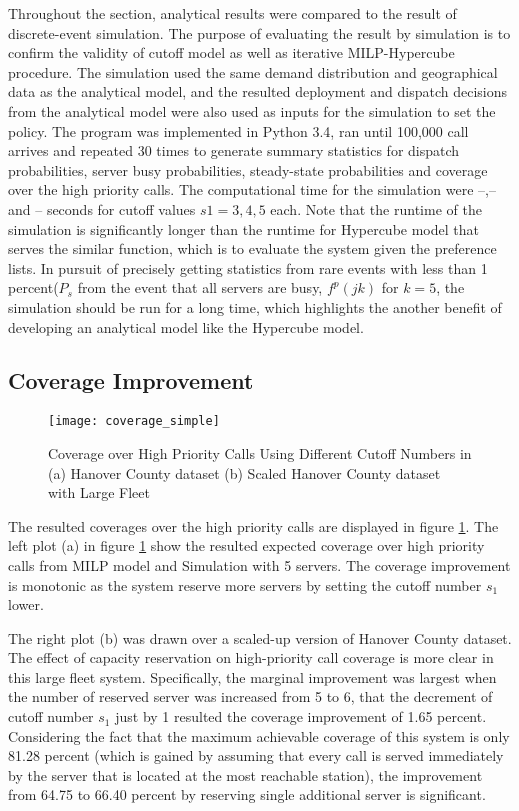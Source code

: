 \documentclass{article}
\begin{document}
Throughout the section, analytical results were compared to the result of discrete-event simulation. The purpose of evaluating the result by simulation is to confirm the validity of cutoff model as well as iterative MILP-Hypercube procedure. The simulation used the same demand distribution and geographical data as the analytical model, and the resulted deployment and dispatch decisions from the analytical model were also used as inputs for the simulation to set the policy. The program was implemented in Python 3.4, ran until 100,000 call arrives and repeated 30 times to generate summary statistics for dispatch probabilities, server busy probabilities, steady-state probabilities and coverage over the high priority calls. The computational time for the simulation were --,-- and -- seconds for cutoff values $s1=3,4,5$ each. Note that the runtime of the simulation is significantly longer than the runtime for Hypercube model that serves the similar function, which is to evaluate the system given the preference lists. In pursuit of precisely getting statistics from rare events with less than 1 percent($P_s$ from the event that all servers are busy, $f^p(jk)$ for $k=5$, the simulation should be run for a long time, which highlights the another benefit of developing an analytical model like the Hypercube model.



\subsection{Coverage Improvement}

\begin{figure}
\centering
\texttt{[image: coverage\_simple]} 
\caption{Coverage over High Priority Calls Using Different Cutoff Numbers in (a) Hanover County dataset (b) Scaled Hanover County dataset with Large Fleet}
\label{fig:coverage}
\end{figure}

The resulted coverages over the high priority calls are displayed in figure \ref{fig:coverage}. The left plot (a) in figure \ref{fig:coverage} show the resulted expected coverage over high priority calls from MILP model and Simulation with 5 servers. The coverage improvement is monotonic as the system reserve more servers by setting the cutoff number $s_1$ lower. 
 
The right plot (b) was drawn over a scaled-up version of Hanover County dataset. The effect of capacity reservation on high-priority call coverage is more clear in this large fleet system. Specifically, the marginal improvement was largest when the number of reserved server was increased from 5 to 6, that the decrement of cutoff number $s_1$ just by 1 resulted the coverage improvement of 1.65 percent. Considering the fact that the maximum achievable coverage of this system is only 81.28 percent (which is gained by assuming that every call is served immediately by the server that is located at the most reachable station), the improvement from 64.75 to 66.40 percent by reserving single additional server is significant.
\end{document}
